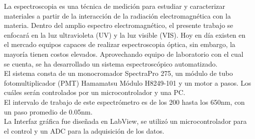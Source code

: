 \tableofcontents
\listoffigures
\listoftables
{}
La espectroscopia es una técnica de medición para estudiar y caracterizar materiales a partir de la interacción de la radiación electromagnética con la materia.
Dentro del amplio espectro electromagnético, el presente trabajo se enfocará en la luz ultravioleta (UV) y la luz visible (VIS). Hoy en día existen en el mercado equipos capaces de realizar espectroscopia óptica, sin embargo, la mayoría tienen costos elevados. Aprovechando equipo de laboratorio con el cual se cuenta, se ha desarrollado un sistema espectroscópico automatizado. \\
El sistema consta de un monocromador SpectraPro 275, un módulo de tubo fotomultiplicador (PMT) Hamamatsu Módulo H8249-101 y un motor a pasos. Los cuáles serán controlados por un microcontrolador y una PC.\\
El intervalo de trabajo de este espectrómetro es de los 200 hasta los 650nm, con un paso promedio de 0.05nm. \\
La Interfaz gráfica fue diseñada en LabView, se utilizó un microcontrolador para el control y un ADC para la adquisición de los datos.
